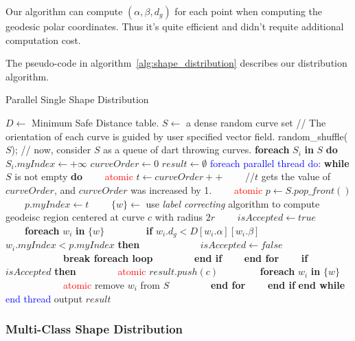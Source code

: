 Our algorithm can compute $(\alpha, \beta, d_g)$ for each point
when computing the geodesic polar coordinates. Thus it's quite efficient and didn't requite additional computation cost.

The pseudo-code in algorithm~\ref{alg:shape_distribution} describes our distribution algorithm.

\begin{algorithm}[htbp]
\caption{Parallel Single Shape Distribution}
\begin{algorithmic}
\State $D \gets$ Minimum Safe Distance table.
\State $S \gets$ a dense random curve set
\State // The orientation of each
curve is guided by user specified vector field.
\State random\_shuffle($S$);
\State // now, consider $S$ as a queue of dart throwing curves.
\State
\textbf{foreach} $S_i$ \textbf{in}
$S$ \textbf{do} $S_i.myIndex \gets +\infty$
\State $curveOrder \gets0$
\State $result \gets \emptyset$
\State
\State \textcolor{blue} {foreach parallel thread do:}
\State \textbf{while} $S$ is not empty \textbf{do}
\State ~~~~\textcolor{red}{atomic} $t \gets curveOrder ++$
\State ~~~~//$t$ gets the value of $curveOrder$, and $curveOrder$ was increased by 1.
\State ~~~~\textcolor{red}{atomic} $p \gets S.pop\_front()$
\State ~~~~$p.myIndex \gets t$
\State ~~~~$\{w\} \gets$ use \textit{label correcting} algorithm to compute geodeisc region centered at curve $c$ with radius $2r$
\State ~~~~$isAccepted \gets true$
\State ~~~~\textbf{foreach} $w_i$ \textbf{in} $\{w\}$
\State ~~~~~~~~\textbf{if} $w_i.d_g < D[w_i.\alpha][w_i.\beta]$   $w_i.myIndex < p.myIndex$ \textbf{then}
\State ~~~~~~~~~~~~$isAccepted \gets false$
\State ~~~~~~~~~~~~\textbf{break foreach loop}
\State ~~~~~~~~\textbf{end if}
\State ~~~~\textbf{end for}
\State ~~~~\textbf{if} $isAccepted$ \textbf{then}
\State ~~~~~~~~\textcolor{red}{atomic} $result.push(c)$
\State ~~~~~~~~\textbf{foreach} $w_i$ \textbf{in} $\{w\}$
\State ~~~~~~~~~~~~\textcolor{red}{atomic} remove $w_i$ from $S$
\State ~~~~~~~~\textbf{end for}
\State ~~~~\textbf{end if}
\State \textbf{end while}
\State \textcolor{blue}{end thread}
\State
\State output $result$
\end{algorithmic}
\label{alg:shape_distribution}
\end{algorithm}



\subsubsection{Multi-Class Shape Distribution}

